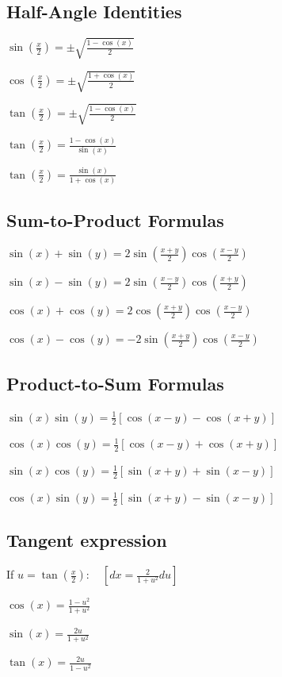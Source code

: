\documentclass[8pt,a4paper]{extarticle}     %
\theoremstyle{definition}
\theoremstyle{definition}
\theoremstyle{definition}
\begin{document}
\begin{multicols}{4}
\subsection{Half-Angle Identities}
\begin{eqlist}
	\item $\sin\left(\frac{x}{2}\right) = \pm\sqrt{\frac{1-\cos(x)}{2}}$
	\item $\cos\left(\frac{x}{2}\right) = \pm\sqrt{\frac{1+\cos(x)}{2}}$
	\item $\tan\left(\frac{x}{2}\right) = \pm\sqrt{\frac{1-\cos(x)}{2}}$
	\item $\tan\left(\frac{x}{2}\right) = \frac{1-\cos(x)}{\sin(x)}$
	\item $\tan\left(\frac{x}{2}\right) = \frac{\sin(x)}{1+\cos(x)}$
\end{eqlist}

\subsection{Sum-to-Product Formulas}
\begin{eqlist}
	\item $\sin(x) + \sin(y) = 2\sin\left(\frac{x+y}{2}\right)\cos\left(\frac{x-y}{2}\right)$
	\item $\sin(x) - \sin(y) = 2\sin\left(\frac{x-y}{2}\right)\cos\left(\frac{x+y}{2}\right)$
	\item $\cos(x) + \cos(y) = 2\cos\left(\frac{x+y}{2}\right)\cos\left(\frac{x-y}{2}\right)$
	\item $\cos(x) - \cos(y) = -2\sin\left(\frac{x+y}{2}\right)\cos\left(\frac{x-y}{2}\right)$
\end{eqlist}

\subsection{Product-to-Sum Formulas}
\begin{eqlist}
	\item $\sin(x)\sin(y) = \frac{1}{2}\left[\cos(x-y)-\cos(x+y)\right]$
	\item $\cos(x)\cos(y) = \frac{1}{2}\left[\cos(x-y)+\cos(x+y)\right]$
	\item $\sin(x)\cos(y) = \frac{1}{2}\left[\sin(x+y)+\sin(x-y)\right]$
	\item $\cos(x)\sin(y) = \frac{1}{2}\left[\sin(x+y)-\sin(x-y)\right]$
\end{eqlist}

\subsection{Tangent expression}
If $u = \tan(\frac{x}{2}):$ $\ \ \ \left[dx = \frac{2}{1+u^2}du\right]$
\begin{eqlist}
	\item $\cos(x) = \frac{1-u^2}{1+u^2}$
	\item $\sin(x) = \frac{2u}{1+u^2}$
	\item $\tan(x) = \frac{2u}{1-u^2}$
\end{eqlist}


\end{multicols}
\end{document}

